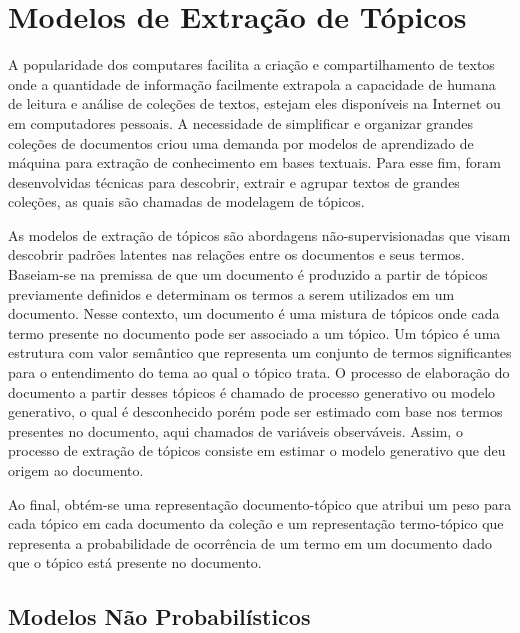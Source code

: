 \section{Modelos de Extração de Tópicos}

A popularidade dos computares facilita a criação e compartilhamento de textos onde a quantidade de informação facilmente extrapola a capacidade de humana de leitura e análise de coleções de textos, estejam eles disponíveis na Internet ou em computadores pessoais. A necessidade de simplificar e organizar grandes coleções de documentos criou uma demanda por modelos de aprendizado de máquina para extração de conhecimento em bases textuais. Para esse fim, foram desenvolvidas técnicas para descobrir, extrair e agrupar textos de grandes coleções, as quais são chamadas de modelagem de tópicos.

As modelos de extração de tópicos são abordagens não-supervisionadas que visam descobrir padrões latentes nas relações entre os documentos e seus termos.  Baseiam-se na premissa de que um documento é produzido a partir de tópicos previamente definidos e determinam os termos a serem utilizados em um documento.  Nesse contexto, um documento é uma mistura de tópicos onde cada termo presente no documento pode ser associado a um tópico. Um tópico é uma estrutura com valor semântico que representa um conjunto de termos significantes para o entendimento do tema ao qual o tópico trata. O processo de elaboração do documento a partir desses tópicos é chamado de processo generativo ou modelo generativo, o qual é desconhecido porém pode ser estimado com base nos termos presentes no documento, aqui chamados de variáveis observáveis. Assim, o processo de extração de tópicos consiste em estimar o modelo generativo que deu origem ao documento.

Ao final, obtém-se uma representação documento-tópico que atribui um peso para cada tópico em cada documento da coleção e um representação termo-tópico que representa a probabilidade de ocorrência de um termo em um documento dado que o tópico está presente no documento.



\subsection{Modelos Não Probabilísticos}


